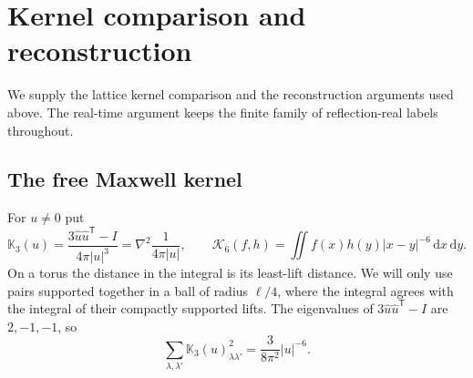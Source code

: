 \documentclass[11pt,letterpaper,reqno]{amsart}
\theoremstyle{definition}
\theoremstyle{remark}
\begin{document}
\appendix
{}
\renewcommand{\theequation}{\thesection.\roman{equation}}
\section{Kernel comparison and reconstruction}\label{app:qcd-imported-proofs}

We supply the lattice kernel comparison and the reconstruction
arguments used above. The real-time argument keeps the finite
family of reflection-real labels throughout.

\subsection{The free Maxwell kernel}\label{app:qcd-maxwell}

For $u\ne0$ put
\begin{equation}\label{IV-45-2}
 \mathbb K_3(u)=\frac{3\widehat u\widehat u^{\mathsf T}-I}
                         {4\pi|u|^3}
               =\nabla^2\frac1{4\pi|u|},\qquad
 \mathcal K_6(f,h)
       =\iint f(x)h(y)|x-y|^{-6}\,\mathrm{d}x\,\mathrm{d}y.
\end{equation}
On a torus the distance in the integral is its least-lift distance.
We will only use pairs supported together in a ball of radius
$\ell/4$, where the integral agrees with the integral of their
compactly supported lifts.  The eigenvalues of
$3\widehat u\widehat u^{\mathsf T}-I$ are $2,-1,-1$, so
\begin{equation}\label{eq:dipole-square}
 \sum_{\lambda,\lambda'}\mathbb K_3(u)_{\lambda\lambda'}^2
                          =\frac3{8\pi^2}|u|^{-6}.
\end{equation}
\end{document}
